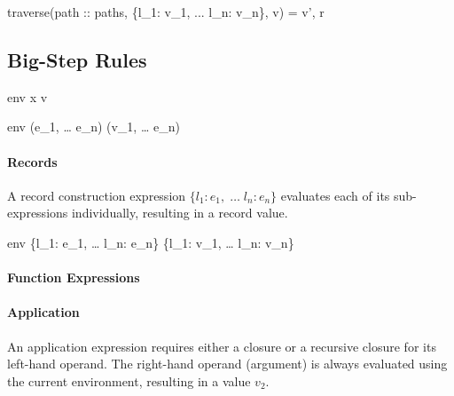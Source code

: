 \documentclass{article}
\begin{document}
    {traverse(path :: paths, \{l_1: v_1, ... l_n: v_n\}, v) = v', r}

\subsection{Big-Step Rules}





    {\mbox{env} \vdash x \Downarrow v}

    {\mbox{env} \vdash (e_1, \; \dots \; e_n) \Downarrow (v_1, \; \dots \; e_n)}

\paragraph{Records}
A record construction expression $\{l_1: e_1, \; \dots \; l_n: e_n\}$ evaluates each of its sub-expressions individually, resulting in a record value.

    {\mbox{env} \vdash \{l_1: e_1, \; \dots \; l_n: e_n\} \Downarrow \{l_1: v_1, \; \dots \; l_n: v_n\}}

\paragraph{Function Expressions}


\paragraph{Application}
An application expression requires either a closure or a recursive closure for its left-hand operand.
The right-hand operand (argument) is always evaluated using the current environment, resulting in a value $v_2$.
\smallskip
\end{document}
